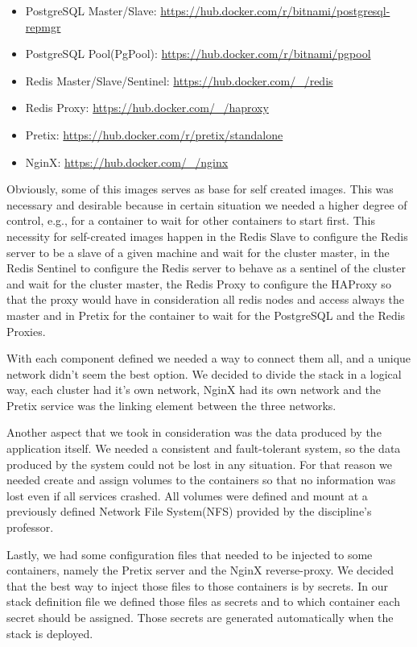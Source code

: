 \documentclass[12pt]{article}
\begin{document}
\begin{itemize}
  \item PostgreSQL Master/Slave: \url{https://hub.docker.com/r/bitnami/postgresql-repmgr}
  \item PostgreSQL Pool(PgPool): \url{https://hub.docker.com/r/bitnami/pgpool}
  \item Redis Master/Slave/Sentinel: \url{https://hub.docker.com/_/redis}
  \item Redis Proxy: \url{https://hub.docker.com/_/haproxy}
  \item Pretix: \url{https://hub.docker.com/r/pretix/standalone}
  \item NginX: \url{https://hub.docker.com/_/nginx}
\end{itemize}

Obviously, some of this images serves as base for self created images. This was necessary and desirable because in certain situation we needed a higher degree of control, e.g., for a container to wait for other containers to start first. This necessity for self-created images happen in the Redis Slave to configure the Redis server to be a slave of a given machine and wait for the cluster master, in the Redis Sentinel to configure the Redis server to behave as a sentinel of the cluster and wait for the cluster master, the Redis Proxy to configure the HAProxy so that the proxy would have in consideration all redis nodes and access always the master and in Pretix for the container to wait for the PostgreSQL and the Redis Proxies.

With each component defined we needed a way to connect them all, and a unique network didn't seem the best option. We decided to divide the stack in a logical way, each cluster had it's own network, NginX had its own network and the Pretix service was the linking element between the three networks.

Another aspect that we took in consideration was the data produced by the application itself. We needed a consistent and fault-tolerant system, so the data produced by the system could not be lost in any situation. For that reason we needed create and assign volumes to the containers so that no information was lost even if all services crashed. All volumes were defined and mount at a previously defined Network File System(NFS) provided by the discipline's professor.

Lastly, we had some configuration files that needed to be injected to some containers, namely the Pretix server and the NginX reverse-proxy. We decided that the best way to inject those files to those containers is by secrets. In our stack definition file we defined those files as secrets and to which container each secret should be assigned. Those secrets are generated automatically when the stack is deployed. 
\end{document}
